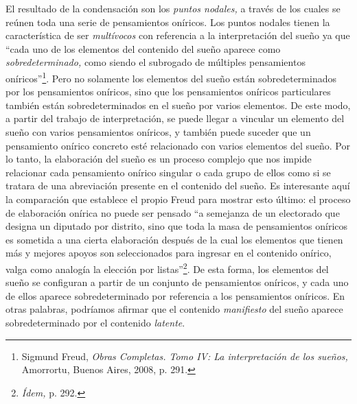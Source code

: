 El resultado de la condensación son los \emph{puntos nodales,} a través de los cuales se reúnen toda una serie de pensamientos oníricos. Los puntos nodales tienen la característica de ser \emph{multívocos} con referencia a la interpretación del sueño ya que \enquote{cada uno de los elementos del contenido del sueño aparece como \emph{sobredeterminado,} como siendo el subrogado de múltiples pensamientos oníricos}\footnote{Sigmund Freud, \emph{Obras Completas. Tomo IV: La interpretación de los sueños,} Amorrortu, Buenos Aires, 2008, p. 291.}. Pero no solamente los elementos del sueño están sobredeterminados por los pensamientos oníricos, sino que los pensamientos oníricos particulares también están sobredeterminados en el sueño por varios elementos. De este modo, a partir del trabajo de interpretación, se puede llegar a vincular un elemento del sueño con varios pensamientos oníricos, y también puede suceder que un pensamiento onírico concreto esté relacionado con varios elementos del sueño. Por lo tanto, la elaboración del sueño es un proceso complejo que nos impide relacionar cada pensamiento onírico singular o cada grupo de ellos como si se tratara de una abreviación presente en el contenido del sueño. Es interesante aquí la comparación que establece el propio Freud para mostrar esto último: el proceso de elaboración onírica no puede ser pensado \enquote{a semejanza de un electorado que designa un diputado por distrito, sino que toda la masa de pensamientos oníricos es sometida a una cierta elaboración después de la cual los elementos que tienen más y mejores apoyos son seleccionados para ingresar en el contenido onírico, valga como analogía la elección por listas}\footnote{\emph{Ídem,} p. 292.}. De esta forma, los elementos del sueño se configuran a partir de un conjunto de pensamientos oníricos, y cada uno de ellos aparece sobredeterminado por referencia a los pensamientos oníricos. En otras palabras, podríamos afirmar que el contenido \emph{manifiesto} del sueño aparece sobredeterminado por el contenido \emph{latente}.

